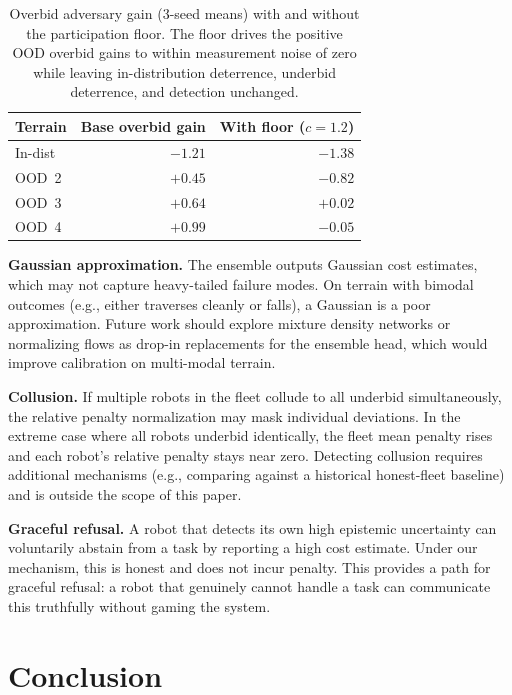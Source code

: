 \documentclass[letterpaper, 10pt, conference]{ieeeconf}
\begin{document}
\begin{table}[h]
\centering
\caption{Overbid adversary gain (3-seed means) with and without the
participation floor.  The floor drives the positive OOD overbid gains to within
measurement noise of zero while leaving in-distribution deterrence, underbid
deterrence, and detection unchanged.}
\label{tab:floor}
\begin{tabular}{lrr}
\toprule
Terrain & Base overbid gain & With floor ($c{=}1.2$) \\
\midrule
In-dist & $-1.21$ & $-1.38$ \\
OOD~2   & $+0.45$ & $-0.82$ \\
OOD~3   & $+0.64$ & $+0.02$ \\
OOD~4   & $+0.99$ & $-0.05$ \\
\bottomrule
\end{tabular}
\end{table}

\textbf{Gaussian approximation.}
The ensemble outputs Gaussian cost estimates, which may not capture heavy-tailed
failure modes.  On terrain with bimodal outcomes (e.g., either traverses cleanly
or falls), a Gaussian is a poor approximation.  Future work should explore
mixture density networks or normalizing flows as drop-in replacements for the
ensemble head, which would improve calibration on multi-modal terrain.

\textbf{Collusion.}
If multiple robots in the fleet collude to all underbid simultaneously, the
relative penalty normalization may mask individual deviations.  In the extreme
case where all robots underbid identically, the fleet mean penalty rises and
each robot's relative penalty stays near zero.  Detecting collusion requires
additional mechanisms (e.g., comparing against a historical honest-fleet
baseline) and is outside the scope of this paper.

\textbf{Graceful refusal.}
A robot that detects its own high epistemic uncertainty can voluntarily abstain
from a task by reporting a high cost estimate.  Under our mechanism, this is
honest and does not incur penalty.  This provides a path for graceful refusal:
a robot that genuinely cannot handle a task can communicate this truthfully
without gaming the system.

\section{Conclusion}
\label{sec:conclusion}
\end{document}

